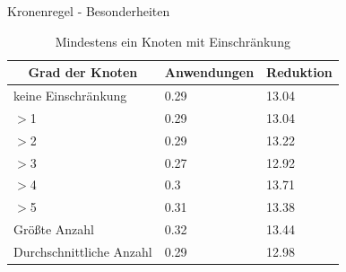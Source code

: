 \documentclass{beamer}
\begin{document}
\begin{frame}{Kronenregel - Besonderheiten}

\begin{table}[htb]
\caption{Mindestens ein Knoten mit Einschränkung\label{tab:degreeOR}}
\vspace*{1em}
\centering

\bgroup
\def\arraystretch{1.3}%


\begin{tabular}[c]{l|l|l}
	
	\multicolumn{1}{c|}{\textbf{Grad der Knoten}} & 
	\multicolumn{1}{c|}{\textbf{Anwendungen}} & 
	\multicolumn{1}{c}{\textbf{Reduktion}} \\ 
	
	\hline

	keine Einschränkung&0.29&13.04\\
	$>$1&0.29 &13.04 \\
	$>$2&0.29 &13.22 \\
	$>$3& 0.27& 12.92 \\
	$>$4& 0.3& 13.71 \\
	$>$5& 0.31&13.38 \\ \pause
	Größte Anzahl& 0.32&13.44 \\
	Durchschnittliche Anzahl& 0.29&12.98 \\
	
\end{tabular}


\egroup

\end{table}

\end{frame}
\end{document}
